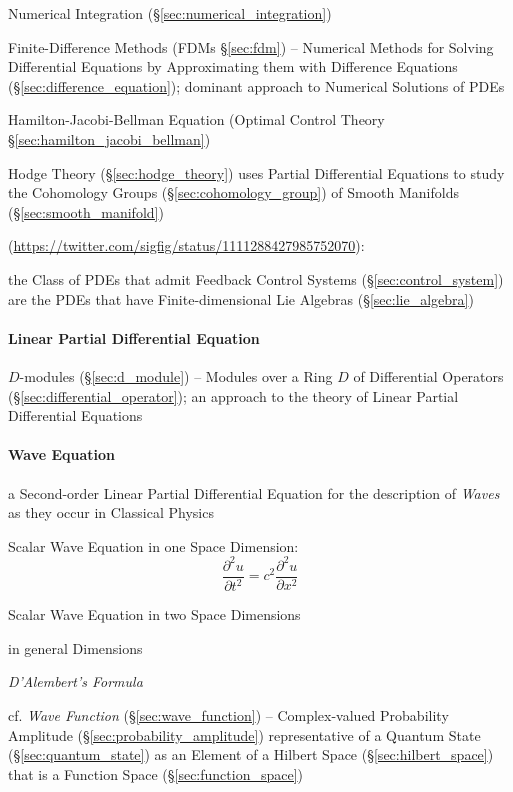 \fist Numerical Integration (\S\ref{sec:numerical_integration})

\fist Finite-Difference Methods (FDMs \S\ref{sec:fdm}) -- Numerical Methods for
Solving Differential Equations by Approximating them with Difference Equations
(\S\ref{sec:difference_equation}); dominant approach to Numerical Solutions of
PDEs

\fist Hamilton-Jacobi-Bellman Equation (Optimal Control Theory
\S\ref{sec:hamilton_jacobi_bellman})

\fist Hodge Theory (\S\ref{sec:hodge_theory}) uses Partial Differential
Equations to study the Cohomology Groups (\S\ref{sec:cohomology_group}) of
Smooth Manifolds (\S\ref{sec:smooth_manifold})

(\url{https://twitter.com/sigfig/status/1111288427985752070}):

the Class of PDEs that admit Feedback Control Systems
(\S\ref{sec:control_system}) are the PDEs that have Finite-dimensional Lie
Algebras (\S\ref{sec:lie_algebra})



\paragraph{Linear Partial Differential Equation}\label{sec:linear_pde}\hfill

\fist $D$-modules (\S\ref{sec:d_module}) -- Modules over a Ring $D$ of
Differential Operators (\S\ref{sec:differential_operator}); an approach to the
theory of Linear Partial Differential Equations



\paragraph{Wave Equation}\label{sec:wave_equation}\hfill

a Second-order Linear Partial Differential Equation for the description of
\emph{Waves} as they occur in Classical Physics

Scalar Wave Equation in one Space Dimension:
\[
  \frac{\partial^2 u}{\partial{t}^2} = c^2 \frac{\partial^2 u}{\partial{x}^2}
\]

Scalar Wave Equation in two Space Dimensions

in general Dimensions

\emph{D'Alembert's Formula}

cf. \emph{Wave Function} (\S\ref{sec:wave_function}) -- Complex-valued
Probability Amplitude (\S\ref{sec:probability_amplitude}) representative of a
Quantum State (\S\ref{sec:quantum_state}) as an Element of a Hilbert Space
(\S\ref{sec:hilbert_space}) that is a Function Space
(\S\ref{sec:function_space})



